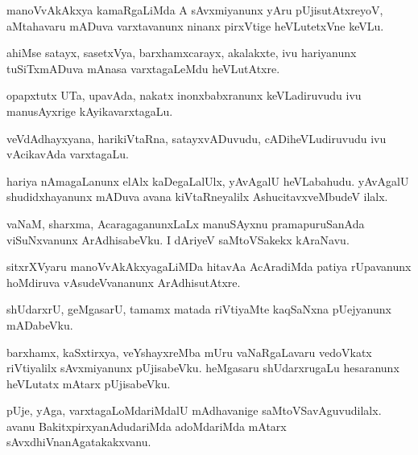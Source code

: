 \documentclass{article}
\begin{document}
\begin{mn}%
manoVvAkAkxya kamaRgaLiMda A sAvxmiyanunx yAru pUjisutAtxreyoV, aMtahavaru mADuva 
varxtavanunx ninanx pirxVtige heVLutetxVne keVLu.
\end{mn}

\begin{mn}%
ahiMse satayx, sasetxVya, barxhamxcarayx, akalakxte, ivu hariyanunx tuSiTxmADuva mAnasa 
varxtagaLeMdu heVLutAtxre.
\end{mn}

\begin{mn}%
opapxtutx UTa, upavAda, nakatx inonxbabxranunx keVLadiruvudu ivu manusAyxrige  
kAyikavarxtagaLu.
\end{mn}

\begin{mn}%
veVdAdhayxyana, harikiVtaRna, satayxvADuvudu, cADiheVLudiruvudu ivu vAcikavAda varxtagaLu.
\end{mn}

\begin{mn}%
hariya nAmagaLanunx elAlx kaDegaLalUlx, yAvAgalU heVLabahudu. yAvAgalU shudidxhayanunx 
mADuva avana kiVtaRneyalilx AshucitavxveMbudeV ilalx.
\end{mn}

\begin{mn}%
vaNaM, sharxma, AcaragaganunxLaLx manuSAyxnu pramapuruSanAda viSuNxvanunx ArAdhisabeVku.  
I dAriyeV  saMtoVSakekx kAraNavu. 
\end{mn}

\begin{mn}%
sitxrXVyaru  manoVvAkAkxyagaLiMDa hitavAa AcAradiMda patiya rUpavanunx hoMdiruva 
vAsudeVvananunx ArAdhisutAtxre.
\end{mn}

\begin{mn}%
shUdarxrU, geMgasarU, tamamx matada riVtiyaMte kaqSaNxna pUejyanunx mADabeVku.
\end{mn}

\begin{mn}%
barxhamx, kaSxtirxya, veYshayxreMba mUru vaNaRgaLavaru vedoVkatx riVtiyalilx sAvxmiyanunx 
pUjisabeVku. heMgasaru shUdarxrugaLu hesaranunx heVLutatx mAtarx pUjisabeVku.
\end{mn}

\begin{mn}%
pUje, yAga, varxtagaLoMdariMdalU mAdhavanige saMtoVSavAguvudilalx. avanu 
BakitxpirxyanAdudariMda adoMdariMda mAtarx sAvxdhiVnanAgatakakxvanu.
\end{mn}
\end{document}

